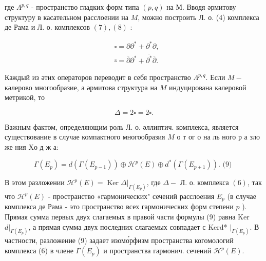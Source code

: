 \documentclass[10pt]{article}
\begin{document}
где $\Lambda^{p, q}$ - пространство гладких фөрм типа $(p, q)$ на М. Вводя әрмитову структуру в касательном расслоении на $M$, можно построить Л. о. (4) комплекса де Рама и Л. о. комплексов $(7),(8)$ :



\[

\begin{aligned}

& \square=\partial \partial^{*}+\partial^{*} \partial, \\

& \bar{\square}=\bar{\partial} \partial^{*}+\overline{\partial^{*}} \bar{\partial} .

\end{aligned}

\]



Каждый из әтих операторов переводит в себя пространство $\Lambda^{p, q}$. Если $M-$ кәлерово многообразие, а әрмитова структура на $M$ индуцирована кәлеровой метрикой, то



\[

\Delta=2 \square=2 \bar{\square} .

\]



Важным фактом, определяющим роль Л. о. әллиптич. комплекса, является существование в случае компактного многообразия $M$ о т ог о на ль ного р а зло же ния $\mathrm{X} о$ д ж а:



\[

\Gamma\left(E_{p}\right)=d\left(\Gamma\left(E_{p-1}\right)\right) \oplus \mathscr{H}^{p}(E) \oplus d^{*}\left(\Gamma\left(E_{p+1}\right)\right) \text {. (9) }

\]



В этом разложении $\mathscr{H}^{p}(E)=\left.\operatorname{Ker} \Delta\right|_{\Gamma\left(E_{p}\right)}$, где $\Delta-$ Л. о. комплекса $(6)$, так что $\mathscr{H}^{p}(E)$ - пространство «гармонических" сечений расслоения $E_{p}$ (в случае комплекса де Рама - это пространство всех гармонических форм степени $p$ ). Прямая сумма первых двух слагаемых в правой части формулы (9) равна Ker $\left.d\right|_{\Gamma\left(E_{p}\right)}$, а прямая сумма двух последних слагаемых совпадает с Kerd* $\left.\right|_{\Gamma\left(E_{p}\right)}$. В частности, разложение (9) задает изомо́рфизм пространства когомологий комплекса (6) в члене $\Gamma\left(E_{p}\right)$ и пространства гармонич. сечений $\mathscr{H}^{p}(E)$.
\end{document}
